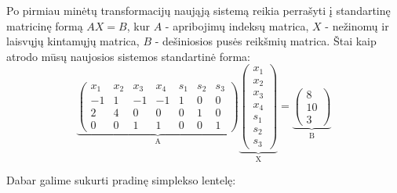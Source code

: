 \documentclass{article}
\begin{document}
Po pirmiau minėtų transformacijų naująją sistemą reikia perrašyti į standartinę matricinę formą $AX=B$, kur $A$ - apribojimų indeksų matrica, $X$ - nežinomų ir laisvųjų kintamųjų matrica, $B$ - dešiniosios pusės reikšmių matrica. Štai kaip atrodo mūsų naujosios sistemos standartinė forma: 
\begin{equation*}
    \underbrace{
    \begin{pmatrix}
        x_1 & x_2 & x_3 & x_4 & s_1 & s_2 & s_3\\
        -1 & 1 & -1 & -1 & 1 & 0 & 0\\
        2 & 4 & 0 & 0 & 0 & 1 & 0\\
        0 & 0 & 1 & 1 & 0 & 0 & 1
    \end{pmatrix}
    }_{\text{A}}
    \underbrace{
    \begin{pmatrix}
        x_1\\
        x_2\\
        x_3\\
        x_4\\
        s_1\\
        s_2\\
        s_3
    \end{pmatrix}
    }_{\text{X}}
    =
    \underbrace{
    \begin{pmatrix}
        8\\
        10\\
        3
    \end{pmatrix}
    }_{\text{B}}
\end{equation*}

Dabar galime sukurti pradinę simplekso lentelę:
\begin{table}[H]
    \centering
    \caption{Pradinė simplekso lentelė, kur $C_j$ - maksimizavimo tikslo funkcijos indeksai, $B$ - bazinės reikšmės, $C_b$ - bazinių reikšmių indeksai maksimizavimo tikslo funkcijoje, $X_b$ - atitinka standartinės formos $B$ matricai}
    \label{table:1}
\end{table}
\end{document}

